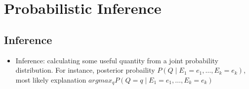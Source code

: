 \documentclass[11pt,a4paper]{report}
\begin{document}

\chapter{Probabilistic Inference}

\section{Inference}

\begin{itemize}
    \item Inference: calculating some useful quantity from a joint probability distribution. For instance, posterior probaility $P(Q \mid E_{1} = e_{1}, \ldots, E_{k} = e_{k})$, most likely explanation $argmax_{q} P(Q = q \mid E_{1} = e_{1}, \ldots, E_{k} = e_{k})$
\end{itemize}
\end{document}
